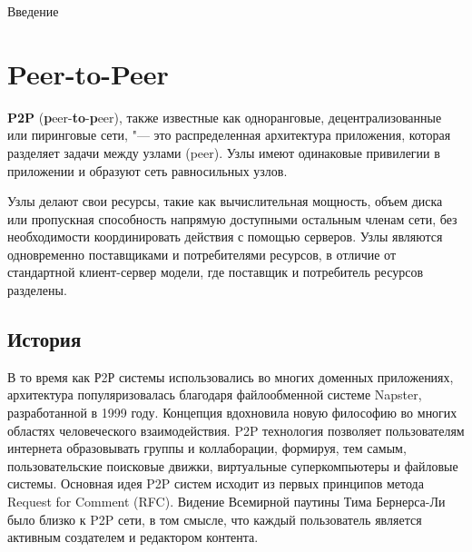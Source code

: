 \documentclass[bachelor, och, coursework]{SCWorks}
\begin{document}




\tableofcontents

\intro
Введение

\section{Peer-to-Peer} %
\textbf{P2P} (\textbf{p}eer-\textbf{to}-\textbf{p}eer), также известные как одноранговые, децентрализованные или пиринговые сети, "--- это распределенная архитектура приложения, которая разделяет задачи между узлами (peer). Узлы имеют одинаковые привилегии в приложении и образуют сеть равносильных узлов.

Узлы делают свои ресурсы, такие как вычислительная мощность, объем диска или пропускная способность напрямую доступными остальным членам сети, без необходимости координировать действия с помощью серверов. Узлы являются одновременно поставщиками и потребителями ресурсов, в отличие от стандартной клиент-сервер модели, где поставщик и потребитель ресурсов разделены.

\subsection{История}
В то время как Р2Р системы использовались во многих доменных приложениях, архитектура популяризовалась благодаря файлообменной системе Napster, разработанной в 1999 году. Концепция вдохновила новую философию во многих областях человеческого взаимодействия. P2P технология позволяет пользователям интернета образовывать группы и коллаборации, формируя, тем самым, пользовательские поисковые движки, виртуальные суперкомпьютеры и файловые системы. Основная идея P2P систем исходит из первых принципов метода Request for Comment (RFC). Видение Всемирной паутины Тима Бернерса-Ли было близко к P2P сети, в том смысле, что каждый пользователь является активным создателем и редактором контента.
\end{document}
